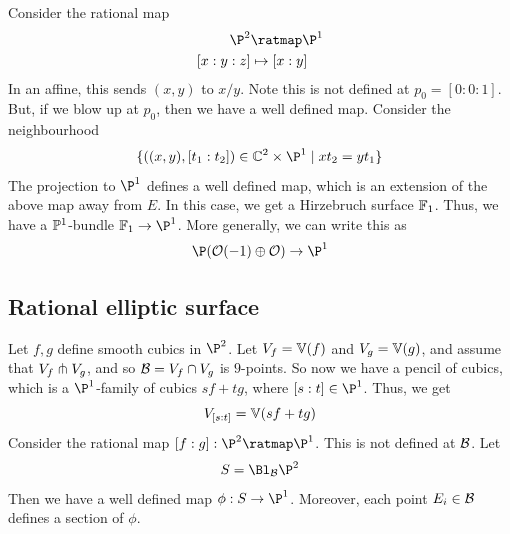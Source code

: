 \documentclass{article}
\begin{document}
Consider the rational map
\begin{align*}
    \P^2 &\ratmap \P^1 \\
    [x:y:z] &\mapsto [x:y]
\end{align*}
In an affine, this sends \((x, y)\) to \(x/y\). Note this is not defined at \(p_0 = [0:0:1]\). But, if we blow up at \(p_0\), then we have a well defined map. Consider the neighbourhood
\[\{((x, y), [t_1:t_2]) \in \C^2 \times \P^1 \mid xt_2 = yt_1\}\]
The projection to \(\P^1\) defines a well defined map, which is an extension of the above map away from \(E\).
In this case, we get a Hirzebruch surface \(\mathbb{F}_1\). Thus, we have a \(\mathbb{P}^1\)-bundle \(\bb F_1 \to \P^1\). More generally, we can write this as
\[\P(\mcO(-1) \oplus \mcO) \to \P^1\]

\subsection{Rational elliptic surface}

Let \(f, g\) define smooth cubics in \(\P^2\). Let \(V_f = \mathbb{V}(f)\) and \(V_g = \mathbb{V}(g)\), and assume that \(V_f \pitchfork V_g\), and so \(\mathcal{B} = V_f \cap V_g\) is \(9\)-points. So now we have a pencil of cubics, which is a \(\P^1\)-family of cubics \(sf + tg\), where \([s : t] \in \P^1\). Thus, we get
\[V_{[s:t]} = \mathbb{V}(sf + tg)\]
Consider the rational map \([f : g] : \P^2 \ratmap \P^1\). This is not defined at \(\mathcal{B}\). Let
\[S = \Bl_\mcB\P^2\]
Then we have a well defined map \(\phi : S \to \P^1\). Moreover, each point \(E_i \in \mathcal{B}\) defines a section of \(\phi\).



\end{document}

